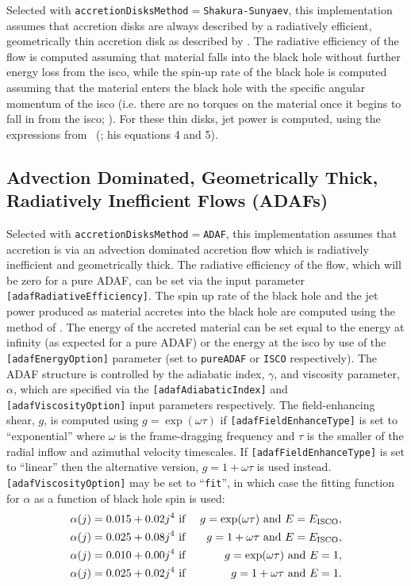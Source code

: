 Selected with {\tt accretionDisksMethod}$=${\tt Shakura-Sunyaev}, this implementation assumes that accretion disks are always described by a radiatively efficient, geometrically thin accretion disk as described by \cite{shakura_black_1973}. The radiative efficiency of the flow is computed assuming that material falls into the black hole without further energy loss from the \gls{isco}, while the spin-up rate of the black hole is computed assuming that the material enters the black hole with the specific angular momentum of the \gls{isco} (i.e. there are no torques on the material once it begins to fall in from the \gls{isco}; \citealt{bardeen_kerr_1970}). For these thin disks, jet power is computed, using the expressions from \citeauthor{meier_association_2001}~(\citeyear{meier_association_2001}; his equations 4 and 5).

\subsection{Advection Dominated, Geometrically Thick, Radiatively Inefficient Flows (ADAFs)}

Selected with {\tt accretionDisksMethod}$=${\tt ADAF}, this implementation assumes that accretion is via an advection dominated accretion flow \citep{narayan_advection-dominated_1994} which is radiatively inefficient and geometrically thick. The radiative efficiency of the flow, which will be zero for a pure ADAF, can be set via the input parameter {\tt [adafRadiativeEfficiency]}. The spin up rate of the black hole and the jet power produced as material accretes into the black hole are computed using the method of \cite{benson_maximum_2009}. The energy of the accreted material can be set equal to the energy at infinity (as expected for a pure ADAF) or the energy at the \gls{isco} by use of the {\tt [adafEnergyOption]} parameter (set to {\tt pureADAF} or {\tt ISCO} respectively). The ADAF structure is controlled by the adiabatic index, $\gamma$, and viscosity parameter, $\alpha$, which are specified via the {\tt [adafAdiabaticIndex]} and {\tt [adafViscosityOption]} input parameters respectively. The field-enhancing shear, $g$, is computed using $g=\exp(\omega \tau)$ if {\tt [adafFieldEnhanceType]} is set to ``exponential'' where $\omega$ is the frame-dragging frequency and $\tau$ is the smaller of the radial inflow and azimuthal velocity timescales. If  {\tt [adafFieldEnhanceType]} is set to ``linear'' then the alternative version, $g=1+\omega \tau$ is used instead. {\tt [adafViscosityOption]} may be set to ``{\tt fit}'', in which case the fitting function for $\alpha$ as a function of black hole spin is used:
\begin{eqnarray}
\alpha(j)=0.015+0.02 j^4 & \hbox{ if  }& g=\exp(\omega\tau) \hbox{ and } E=E_{\rm ISCO}, \\
\alpha(j)=0.025+0.08 j^4 & \hbox{ if } & g=1+\omega\tau \hbox{ and } E=E_{\rm ISCO}, \\
\alpha(j)=0.010+0.00 j^4 & \hbox{ if } & g=\exp(\omega\tau) \hbox{ and } E=1, \\
\alpha(j)=0.025+0.02 j^4 & \hbox{ if } & g=1+\omega\tau \hbox{ and } E=1.  
\end{eqnarray}


